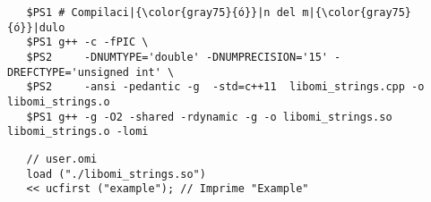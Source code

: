 \lstset{language=bash} 
\begin{lstlisting}
   $PS1 # Compilaci|{\color{gray75}{ó}}|n del m|{\color{gray75}{ó}}|dulo
   $PS1 g++ -c -fPIC \
   $PS2     -DNUMTYPE='double' -DNUMPRECISION='15' -DREFCTYPE='unsigned int' \
   $PS2     -ansi -pedantic -g  -std=c++11  libomi_strings.cpp -o libomi_strings.o
   $PS1 g++ -g -O2 -shared -rdynamic -g -o libomi_strings.so libomi_strings.o -lomi
\end{lstlisting}

\lstset{language=omi} 
\begin{lstlisting}
   // user.omi
   load ("./libomi_strings.so")
   << ucfirst ("example"); // Imprime "Example"
\end{lstlisting}






